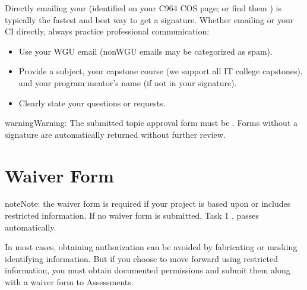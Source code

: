 \documentclass[letterpaper,10pt,english]{jupyterBook}
\begin{document}
\sphinxAtStartPar
Directly emailing your  (identified on your C964 COS page; or find them {\hyperref[\detokenize{ci_c964:ci-c964}]{}}) is typically the fastest and best way to get a signature. Whether emailing  or your CI directly, always practice professional communication:
\begin{itemize}
\item {} 
\sphinxAtStartPar
Use your WGU email (non\sphinxhyphen{}WGU emails may be categorized as spam).

\item {} 
\sphinxAtStartPar
Provide a subject, your capstone course (we support all IT college capstones), and your program mentor’s name (if not in your signature).

\item {} 
\sphinxAtStartPar
Clearly state your questions or requests.

\end{itemize}

\begin{sphinxadmonition}{warning}{Warning:}
\sphinxAtStartPar
The submitted topic approval form must be . Forms without a signature are automatically returned without further review.
\end{sphinxadmonition}


\section{Waiver Form}
\label{\detokenize{task1:waiver-form}}\label{\detokenize{task1:task1-waiver-form}}


\begin{sphinxadmonition}{note}{Note:}
\sphinxAtStartPar
the waiver form is  required if your project is based upon or includes restricted information. If no waiver form is submitted, Task 1 , passes automatically.
\end{sphinxadmonition}

\sphinxAtStartPar
In most cases, obtaining authorization can be avoided by fabricating or masking identifying information. But if you choose to move forward using restricted information, you must obtain documented permissions and submit them along with a waiver form to Assessments.
\begin{quote}

\sphinxAtStartPar
{}
\end{quote}
\end{document}
